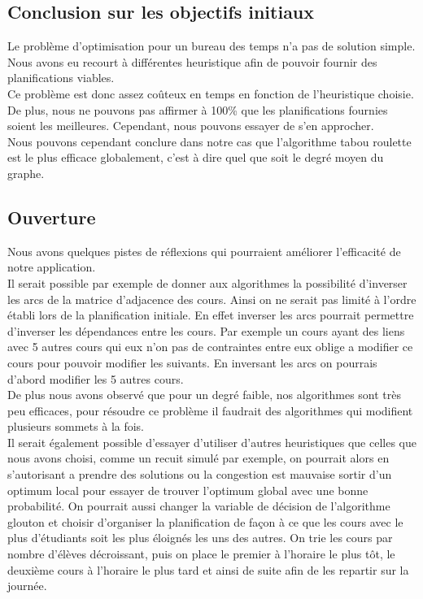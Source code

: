 \documentclass[a4paper,11pt]{article}
\begin{document}
	\subsection{Conclusion sur les objectifs initiaux}
		Le problème d'optimisation pour un bureau des temps n'a pas de solution simple. Nous avons eu recourt à différentes heuristique afin de pouvoir fournir des planifications viables.\\
		Ce problème est donc assez coûteux en temps en fonction de l'heuristique choisie. De plus, nous ne pouvons pas affirmer à 100\% que les planifications fournies soient les meilleures. Cependant, nous pouvons essayer de s'en approcher.\\
		Nous pouvons cependant conclure dans notre cas que l'algorithme tabou roulette est le plus efficace globalement, c'est à dire quel que soit le degré moyen du graphe.\\

	\subsection{Ouverture}
		Nous avons quelques pistes de réflexions qui pourraient améliorer l'efficacité de notre application.\\
		Il serait possible par exemple de donner aux algorithmes la possibilité d'inverser les arcs de la matrice d'adjacence des cours. Ainsi on ne serait pas limité à l'ordre établi lors de la planification initiale. En effet inverser les arcs pourrait permettre d'inverser les dépendances entre les cours. Par exemple un cours ayant des liens avec 5 autres cours qui eux n'on pas de contraintes entre eux oblige a modifier ce cours pour pouvoir modifier les suivants. En inversant les arcs on pourrais d'abord modifier les 5 autres cours. \\
		De plus nous avons observé que pour un degré faible, nos algorithmes sont très peu efficaces, pour résoudre ce problème il faudrait des algorithmes qui modifient plusieurs sommets à la fois. \\
		Il serait également possible d'essayer d'utiliser d'autres heuristiques que celles que nous avons choisi, comme un recuit simulé par exemple, on pourrait alors en s'autorisant a prendre des solutions ou la congestion est mauvaise sortir d'un optimum local pour essayer de trouver l'optimum global avec une bonne probabilité. On pourrait aussi changer la variable de décision de l'algorithme glouton et choisir d'organiser la planification de façon à ce que les cours avec le plus d'étudiants soit les plus éloignés les uns des autres. On trie les cours par nombre d'élèves décroissant, puis on place le premier à l'horaire le plus tôt, le deuxième cours à l'horaire le plus tard et ainsi de suite afin de les repartir sur la journée.
\end{document}
